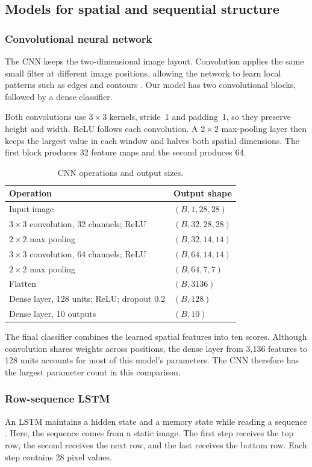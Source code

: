 \clearpage
\subsection{Models for spatial and sequential structure}
\subsubsection{Convolutional neural network}
The CNN keeps the two-dimensional image layout. Convolution applies the same
small filter at different image positions, allowing the network to learn local
patterns such as edges and contours \cite{fresh_cnn}. Our model has two
convolutional blocks, followed by a dense classifier.

Both convolutions use $3\times3$ kernels, stride~1 and padding~1, so they preserve
height and width. ReLU follows each convolution. A $2\times2$ max-pooling layer
then keeps the largest value in each window and halves both spatial dimensions.
The first block produces 32 feature maps and the second produces 64.

\begin{table}[h]
\centering
\caption{CNN operations and output sizes.}
\label{tab:fresh_cnn}
\begin{tabularx}{\linewidth}{X l}
\toprule
Operation & Output shape\\
\midrule
Input image & $(B,1,28,28)$\\
$3\times3$ convolution, 32 channels; ReLU & $(B,32,28,28)$\\
$2\times2$ max pooling & $(B,32,14,14)$\\
$3\times3$ convolution, 64 channels; ReLU & $(B,64,14,14)$\\
$2\times2$ max pooling & $(B,64,7,7)$\\
Flatten & $(B,3136)$\\
Dense layer, 128 units; ReLU; dropout 0.2 & $(B,128)$\\
Dense layer, 10 outputs & $(B,10)$\\
\bottomrule
\end{tabularx}
\end{table}

The final classifier combines the learned spatial features into ten scores.
Although convolution shares weights across positions, the dense layer from
3,136 features to 128 units accounts for most of this model's parameters.
The CNN therefore has the largest parameter count in this comparison.

\subsubsection{Row-sequence LSTM}
An LSTM maintains a hidden state and a memory state while reading a sequence
\cite{fresh_lstm}. Here, the sequence comes from a static image. The first step
receives the top row, the second receives the next row, and the last receives
the bottom row. Each step contains 28 pixel values.

